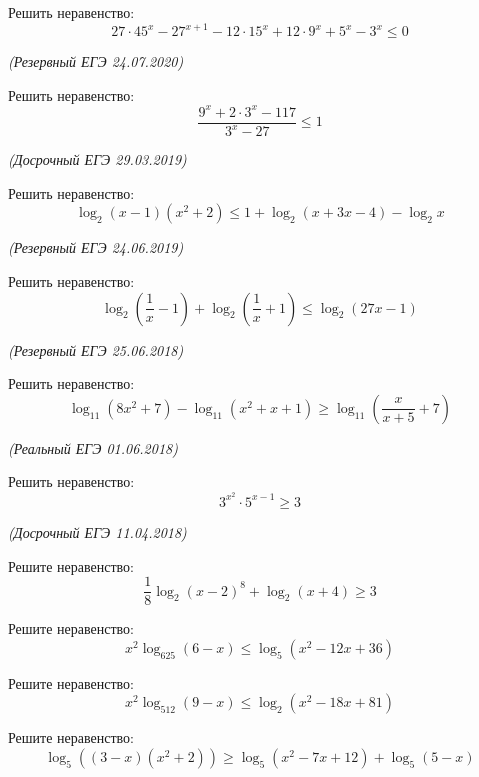 \begin{class}[number=4]
	\begin{listofex}
		\item Решить неравенство:
		\[ 27\cdot45^x-27^{x+1}-12\cdot15^x+12\cdot9^x+5^x-3^x\le0 \]
		\begin{flushright}
			\textit{(Резервный ЕГЭ 24.07.2020)}
		\end{flushright}
		\item Решить неравенство:
		\[ \dfrac{9^x+2\cdot3^x-117}{3^x-27}\le1 \]
		\begin{flushright}
			\textit{(Досрочный ЕГЭ 29.03.2019)}
		\end{flushright}
		\item Решить неравенство:
		\[ \log_2(x-1)(x^2+2)\le1+\log_2(x+3x-4)-\log_2x \]
		\begin{flushright}
			\textit{(Резервный ЕГЭ 24.06.2019)}
		\end{flushright}
		\item Решить неравенство:
		\[ \log_2\left( \dfrac{1}{x}-1 \right)+\log_2\left( \dfrac{1}{x}+1 \right)\le\log_2(27x-1) \]
		\begin{flushright}
			\textit{(Резервный ЕГЭ 25.06.2018)}
		\end{flushright}
		\item Решить неравенство:
		\[ \log_{11}(8x^2+7)-\log_{11}(x^2+x+1)\ge\log_{11}\left( \dfrac{x}{x+5}+7 \right) \]
		\begin{flushright}
			\textit{(Реальный ЕГЭ 01.06.2018)}
		\end{flushright}
		\item Решить неравенство:
		\[ 3^{x^2}\cdot5^{x-1}\ge3 \]
		\begin{flushright}
			\textit{(Досрочный ЕГЭ 11.04.2018)}
		\end{flushright}
	\end{listofex}
\end{class}

\begin{homework}[number=2]
	\begin{listofex}
		\item Решите неравенство:
		\[\dfrac{1}{8}\log_2(x-2)^8+\log_2(x+4)\geq3\]
		\item Решите неравенство:
		\[x^2\log_{625}(6-x)\leq\log_5(x^2-12x+36)\]
		\item Решите неравенство:
		\[x^2\log_{512}(9-x)\leq\log_2(x^2-18x+81)\]
		\item Решите неравенство:
		\[\log_5\left( (3-x)(x^2+2) \right)\geq\log_5(x^2-7x+12)+\log_5(5-x)\]
	\end{listofex}
\end{homework}

